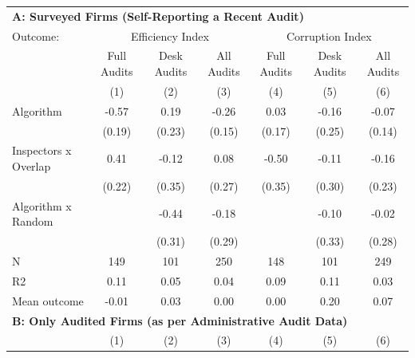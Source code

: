 \begin{tabular}{lccc|ccc} \toprule
\multicolumn{7}{l}{\textbf{A: Surveyed Firms (Self-Reporting a Recent Audit)}} \\ \multicolumn{1}{l}{Outcome:} & \multicolumn{3}{c}{Efficiency Index} & \multicolumn{3}{c}{Corruption Index} \\ \multicolumn{1}{l}{} & Full Audits & Desk Audits & All Audits & Full Audits & Desk Audits & All Audits \\ \multicolumn{1}{l}{} & (1) & (2) & (3) & (4) & (5) & (6) \\ \midrule
Algorithm   &       -0.57\sym{***}&        0.19         &       -0.26\sym{*}  &        0.03         &       -0.16         &       -0.07         \\
            &      (0.19)         &      (0.23)         &      (0.15)         &      (0.17)         &      (0.25)         &      (0.14)         \\
\addlinespace
Inspectors x Overlap&        0.41\sym{*}  &       -0.12         &        0.08         &       -0.50         &       -0.11         &       -0.16         \\
            &      (0.22)         &      (0.35)         &      (0.27)         &      (0.35)         &      (0.30)         &      (0.23)         \\
\addlinespace
Algorithm x Random&                     &       -0.44         &       -0.18         &                     &       -0.10         &       -0.02         \\
            &                     &      (0.31)         &      (0.29)         &                     &      (0.33)         &      (0.28)         \\
\midrule
N           &         149         &         101         &         250         &         148         &         101         &         249         \\
R2          &        0.11         &        0.05         &        0.04         &        0.09         &        0.11         &        0.03         \\
Mean outcome&       -0.01         &        0.03         &        0.00         &        0.00         &        0.20         &        0.07         \\

\midrule \multicolumn{7}{l}{\textbf{B: Only Audited Firms (as per Administrative Audit Data)}} \\ \multicolumn{1}{l}{} & (1) & (2) & (3) & (4) & (5) & (6) \\ \midrule


\end{tabular}
